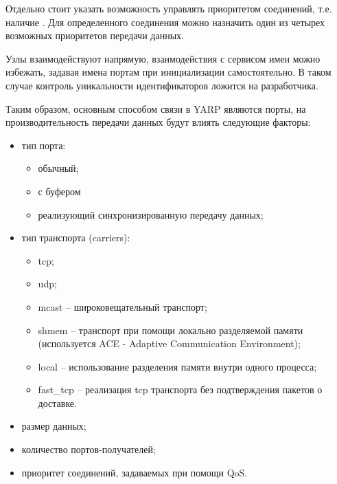 Отдельно стоит указать возможность управлять приоритетом соединений, т.е. наличие . Для определенного соединения можно назначить один из четырех возможных приоритетов передачи данных.

Узлы взаимодействуют напрямую, взаимодействия с сервисом имен можно избежать, задавая имена портам при инициализации самостоятельно. В таком случае контроль уникальности идентификаторов ложится на разработчика.

Таким образом, основным способом связи в YARP являются порты, на производительность передачи данных будут влиять следующие факторы:
\begin{itemize}[noitemsep]
	\item тип порта:
	\begin{itemize}[noitemsep]
		\item обычный;
		\item с буфером
		\item реализующий синхронизированную передачу данных;
	\end{itemize}
	\item тип транспорта (carriers):
	\begin{itemize}[noitemsep]
		\item tcp;
		\item udp;
		\item mcast -- широковещательный транспорт;
		\item shmem -- транспорт при помощи локально разделяемой памяти (используется ACE - Adaptive Communication Environment);
		\item local -- использование разделения памяти внутри одного процесса;
		\item fast\_tcp -- реализация tcp транспорта без подтверждения пакетов о доставке.
	\end{itemize}
	\item размер данных;
	\item количество портов-получателей;
	\item приоритет соединений, задаваемых при помощи QoS.
\end{itemize}